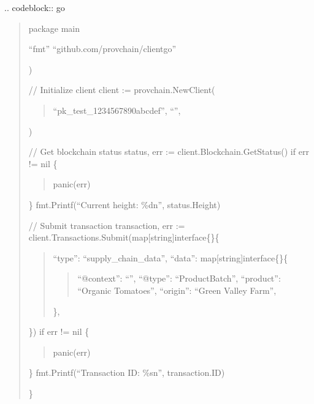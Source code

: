 \documentclass[letterpaper,10pt,english]{sphinxmanual}
\begin{document}
\sphinxAtStartPar
{}
.. code\sphinxhyphen{}block:: go
\begin{quote}

\sphinxAtStartPar
package main
\begin{description}
\sphinxAtStartPar
“fmt”
“github.com/provchain/client\sphinxhyphen{}go”

\end{description}

\sphinxAtStartPar
)
\begin{description}
\sphinxAtStartPar
// Initialize client
client := provchain.NewClient(
\begin{quote}

\sphinxAtStartPar
“pk\_test\_1234567890abcdef”,
“”,
\end{quote}

\sphinxAtStartPar
)

\sphinxAtStartPar
// Get blockchain status
status, err := client.Blockchain.GetStatus()
if err != nil \{
\begin{quote}

\sphinxAtStartPar
panic(err)
\end{quote}

\sphinxAtStartPar
\}
fmt.Printf(“Current height: \%dn”, status.Height)

\sphinxAtStartPar
// Submit transaction
transaction, err := client.Transactions.Submit(map{[}string{]}interface\{\}\{
\begin{quote}

\sphinxAtStartPar
“type”: “supply\_chain\_data”,
“data”: map{[}string{]}interface\{\}\{
\begin{quote}

\sphinxAtStartPar
“@context”: “”,
“@type”:   “ProductBatch”,
“product”: “Organic Tomatoes”,
“origin”:  “Green Valley Farm”,
\end{quote}

\sphinxAtStartPar
\},
\end{quote}

\sphinxAtStartPar
\})
if err != nil \{
\begin{quote}

\sphinxAtStartPar
panic(err)
\end{quote}

\sphinxAtStartPar
\}
fmt.Printf(“Transaction ID: \%sn”, transaction.ID)

\end{description}

\sphinxAtStartPar
\}
\end{quote}
\end{document}

